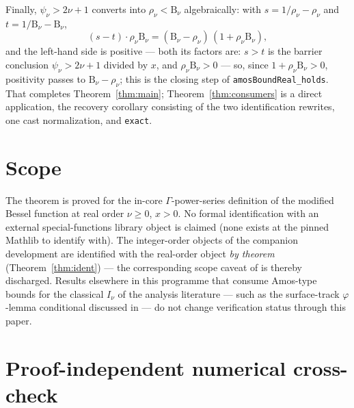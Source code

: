 \documentclass[11pt]{article}
\newcommand{\lean}[1]{\texttt{#1}}
\newcommand{\RHS}{\mathrm{B}}
\begin{document}
Finally, $\psi_\nu > 2\nu+1$ converts into $\rho_\nu < \RHS_\nu$
algebraically: with $s = 1/\rho_\nu - \rho_\nu$ and
$t = 1/\RHS_\nu - \RHS_\nu$,
\[
(s - t)\cdot \rho_\nu \RHS_\nu
= (\RHS_\nu - \rho_\nu)\,(1 + \rho_\nu \RHS_\nu),
\]
and the left-hand side is positive --- both its factors are:
$s > t$ is the barrier conclusion $\psi_\nu > 2\nu+1$ divided by
$x$, and $\rho_\nu \RHS_\nu > 0$ --- so, since
$1 + \rho_\nu \RHS_\nu > 0$, positivity passes to
$\RHS_\nu - \rho_\nu$; this is the closing step of
\lean{amosBoundReal\_holds}.  That completes
Theorem~\ref{thm:main}; Theorem~\ref{thm:consumers} is a direct
application, the recovery corollary consisting of the two
identification rewrites, one cast normalization, and \lean{exact}.

\section{Scope}\label{sec:scope}

The theorem is proved for the in-core $\Gamma$-power-series
definition of the modified Bessel function at real order
$\nu \ge 0$, $x > 0$.  No formal identification with an external
special-functions library object is claimed (none exists at the
pinned Mathlib to identify with).  The integer-order objects of the
companion development are identified with the real-order object
\emph{by theorem} (Theorem~\ref{thm:ident}) --- the corresponding
scope caveat of \cite{ErikssonC3} is thereby discharged.  Results
elsewhere in this programme that consume Amos-type bounds for the
classical $I_\nu$ of the analysis literature --- such as the
surface-track $\varphi$-lemma conditional discussed in
\cite{ErikssonC2} --- do not change verification status through
this paper.

\section{Proof-independent numerical cross-check}\label{sec:crosscheck}
\end{document}
